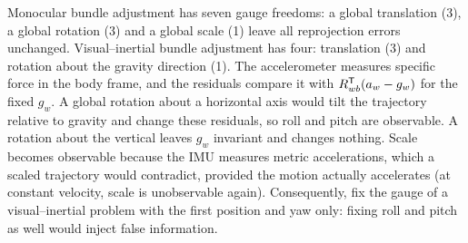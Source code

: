 \begin{solutions}
  \item Monocular bundle adjustment has seven gauge freedoms: a global translation (3), a global rotation (3) and a global scale (1) leave all reprojection errors
        unchanged. Visual--inertial bundle adjustment has four: translation (3) and rotation about the gravity direction (1). The accelerometer measures
        specific force in the body frame, and the residuals compare it with $R_{wb}^{\mathsf{T}}(a_w - g_w)$ for the fixed $g_w$. A global rotation about a horizontal axis would tilt the
        trajectory relative to gravity and change these residuals, so roll and pitch are observable. A rotation about the vertical leaves $g_w$ invariant and
        changes nothing. Scale becomes observable because the IMU measures metric accelerations, which a scaled trajectory would contradict, provided
        the motion actually accelerates (at constant velocity, scale is unobservable again). Consequently, fix the gauge of a visual--inertial problem with
        the first position and yaw only: fixing roll and pitch as well would inject false information.
\end{solutions}
